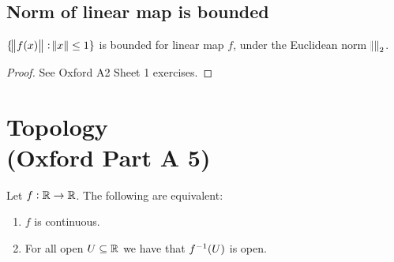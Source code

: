 \subsection{Norm of linear map is bounded}
\begin{theorem}
  $\{\norm{f(x)} : \norm{x} \leq 1\}$ is bounded for linear map $f$, under the Euclidean norm
  $\norm{}_2$.
\end{theorem}

\begin{proof}
  See Oxford A2 Sheet 1 exercises.
\end{proof}

\section{Topology\\(Oxford Part A 5)}




\begin{theorem*}
  Let $f:\mathbb{R} \to \mathbb{R}$. The following are equivalent:
  \begin{enumerate}
  \item $f$ is continuous.

  \item For all open $U \subseteq \mathbb{R}$ we have that $f^{-1}(U)$ is open.
  \end{enumerate}
\end{theorem*}

